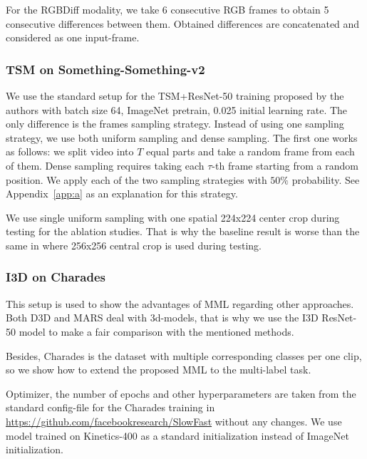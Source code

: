 \documentclass[conference]{IEEEtran}
\begin{document}
For the RGBDiff modality, we take 6 consecutive RGB frames to obtain 5 consecutive differences between them. Obtained differences are concatenated and considered as one input-frame.

\subsubsection{TSM on Something-Something-v2}

We use the standard setup for the TSM+ResNet-50 \cite{he2016deep} training proposed by the authors with batch size 64, ImageNet pretrain, 0.025 initial learning rate. The only difference is the frames sampling strategy. Instead of using one sampling strategy, we use both uniform sampling and dense sampling. The first one works as follows: we split video into $T$ equal parts and take a random frame from each of them. Dense sampling requires taking each $\tau$-th frame starting from a random position. We apply each of the two sampling strategies with $50\%$ probability. See Appendix~\ref{app:a} as an explanation for this strategy.

We use single uniform sampling with one spatial 224x224 center crop during testing for the ablation studies. That is why the baseline result is worse than the same in \cite{lin2019tsm} where 256x256 central crop is used during testing.

\subsubsection{I3D on Charades}

This setup is used to show the advantages of MML regarding other approaches. Both D3D \cite{Stroud_2020_WACV} and MARS \cite{Crasto_2019_CVPR} deal with 3d-models, that is why we use the I3D ResNet-50 model \cite{carreira2017quo} to make a fair comparison with the mentioned methods.

Besides, Charades is the dataset with multiple corresponding classes per one clip, so we show how to extend the proposed MML to the multi-label task.

Optimizer, the number of epochs and other hyperparameters are taken from the standard config-file for the Charades training in \url{https://github.com/facebookresearch/SlowFast} without any changes. We use model trained on Kinetics-400 \cite{carreira2017quo} as a standard initialization instead of ImageNet initialization.
\end{document}
